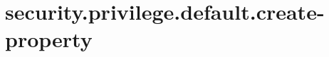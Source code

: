 \section{security.privilege.default.create-property}
\label{configuration:SecurityPrivilegeDefaultCreateProperty}
\TODO
